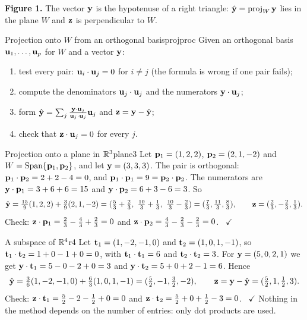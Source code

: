 \documentclass[11pt]{article}
\begin{document}
\noindent\textbf{Figure 1.} The vector $\mathbf{y}$ is the hypotenuse of a right triangle: $\hat{\mathbf{y}}=\operatorname{proj}_W\mathbf{y}$ lies in the plane $W$ and $\mathbf{z}$ is perpendicular to $W$.

\begin{proc}{Projection onto $W$ from an orthogonal basis}{projproc}
Given an orthogonal basis $\mathbf{u}_1,\dots,\mathbf{u}_p$ for $W$ and a vector $\mathbf{y}$:
\begin{enumerate}[nosep]
  \item test every pair: $\mathbf{u}_i\cdot\mathbf{u}_j=0$ for $i\neq j$ (the formula is wrong if one pair fails);
  \item compute the denominators $\mathbf{u}_j\cdot\mathbf{u}_j$ and the numerators $\mathbf{y}\cdot\mathbf{u}_j$;
  \item form $\hat{\mathbf{y}}=\sum_j\frac{\mathbf{y}\cdot\mathbf{u}_j}{\mathbf{u}_j\cdot\mathbf{u}_j}\mathbf{u}_j$ and $\mathbf{z}=\mathbf{y}-\hat{\mathbf{y}}$;
  \item check that $\mathbf{z}\cdot\mathbf{u}_j=0$ for every $j$.
\end{enumerate}
\end{proc}

\begin{exmp}{Projection onto a plane in $\mathbb{R}^3$}{plane3}
Let $\mathbf{p}_1=(1,2,2)$, $\mathbf{p}_2=(2,1,-2)$ and $W=\operatorname{Span}\{\mathbf{p}_1,\mathbf{p}_2\}$, and let $\mathbf{y}=(3,3,3)$. The pair is orthogonal: $\mathbf{p}_1\cdot\mathbf{p}_2=2+2-4=0$, and $\mathbf{p}_1\cdot\mathbf{p}_1=9=\mathbf{p}_2\cdot\mathbf{p}_2$. The numerators are $\mathbf{y}\cdot\mathbf{p}_1=3+6+6=15$ and $\mathbf{y}\cdot\mathbf{p}_2=6+3-6=3$. So
\[
\hat{\bv{y}}=\tfrac{15}{9}(1,2,2)+\tfrac39(2,1,-2)=(\tfrac53+\tfrac23,\ \tfrac{10}3+\tfrac13,\ \tfrac{10}3-\tfrac23)=(\tfrac73,\tfrac{11}3,\tfrac83),\qquad\bv{z}=(\tfrac23,-\tfrac23,\tfrac13).
\]
Check: $\mathbf{z}\cdot\mathbf{p}_1=\tfrac23-\tfrac43+\tfrac23=0$ and $\mathbf{z}\cdot\mathbf{p}_2=\tfrac43-\tfrac23-\tfrac23=0$. \ $\checkmark$
\end{exmp}

\begin{exmp}{A subspace of $\mathbb{R}^4$}{r4}
Let $\mathbf{t}_1=(1,-2,-1,0)$ and $\mathbf{t}_2=(1,0,1,-1)$, so $\mathbf{t}_1\cdot\mathbf{t}_2=1+0-1+0=0$, with $\mathbf{t}_1\cdot\mathbf{t}_1=6$ and $\mathbf{t}_2\cdot\mathbf{t}_2=3$. For $\mathbf{y}=(5,0,2,1)$ we get $\mathbf{y}\cdot\mathbf{t}_1=5-0-2+0=3$ and $\mathbf{y}\cdot\mathbf{t}_2=5+0+2-1=6$. Hence
\[
\hat{\mathbf{y}}=\tfrac36(1,-2,-1,0)+\tfrac63(1,0,1,-1)=(\tfrac52,-1,\tfrac32,-2),\qquad\mathbf{z}=\mathbf{y}-\hat{\mathbf{y}}=(\tfrac52,1,\tfrac12,3).
\]
Check: $\mathbf{z}\cdot\mathbf{t}_1=\tfrac52-2-\tfrac12+0=0$ and $\mathbf{z}\cdot\mathbf{t}_2=\tfrac52+0+\tfrac12-3=0$. \ $\checkmark$ Nothing in the method depends on the number of entries: only dot products are used.
\end{exmp}
\end{document}
